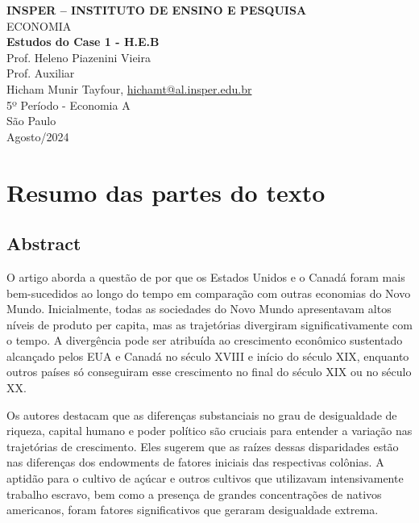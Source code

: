 \documentclass[a4paper,12pt]{article}[abntex2]
\begin{document}
\begin{titlepage}
    \centering
    \vspace*{1cm}
    \Large\textbf{INSPER – INSTITUTO DE ENSINO E PESQUISA}\\
    \Large ECONOMIA\\
    \vspace{1.5cm}
    \Large\textbf{Estudos do Case 1 - H.E.B}\\
    \vspace{1.5cm}
    Prof. Heleno Piazenini Vieira\\
    Prof. Auxiliar \\
    \vfill
    \normalsize
    Hicham Munir Tayfour, \href{mailto:hichamt@al.insper.edu.br}{hichamt@al.insper.edu.br}\\
    5º Período - Economia A\\
    \vfill
    São Paulo\\
    Agosto/2024
\end{titlepage}

\newpage
\tableofcontents
\thispagestyle{empty} %
\newpage
\setcounter{page}{1} %
\justify
\onehalfspacing

\pagestyle{fancy}
\fancyhf{}
\rhead{\thepage}

\section{\textbf{Resumo das partes do texto}}


\subsection*{\textbf{Abstract}}

O artigo aborda a questão de por que os Estados Unidos e o Canadá foram mais bem-sucedidos ao longo do tempo em comparação com outras economias do Novo Mundo. Inicialmente, todas as sociedades do Novo Mundo apresentavam altos níveis de produto per capita, mas as trajetórias divergiram significativamente com o tempo. A divergência pode ser atribuída ao crescimento econômico sustentado alcançado pelos EUA e Canadá no século XVIII e início do século XIX, enquanto outros países só conseguiram esse crescimento no final do século XIX ou no século XX.

Os autores destacam que as diferenças substanciais no grau de desigualdade de riqueza, capital humano e poder político são cruciais para entender a variação nas trajetórias de crescimento. Eles sugerem que as raízes dessas disparidades estão nas diferenças dos endowments de fatores iniciais das respectivas colônias. A aptidão para o cultivo de açúcar e outros cultivos que utilizavam intensivamente trabalho escravo, bem como a presença de grandes concentrações de nativos americanos, foram fatores significativos que geraram desigualdade extrema.
\end{document}
